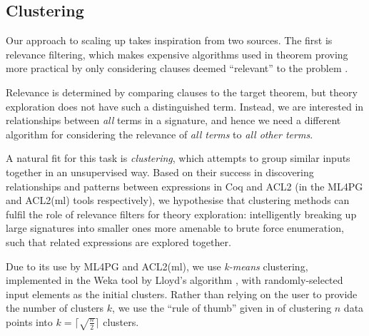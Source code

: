 \iffalse
TODO
In fact, there are similarities between the way a TE system like \qspec{} can generalise from checking \emph{particular} properties to \emph{inventing} new ones, and the way counterexample finders like \qcheck{} can generalise from testing \emph{particular} expressions to \emph{inventing} expressions to test. One of our aims is to understand the implications of this generalisation, the lessons that each can learn from the other's approach to term generation, and the consequences for testing and QA in general.
\fi

\subsection{Clustering}
\label{sec:clustering}

Our approach to scaling up \qspec{} takes inspiration from two sources. The first is relevance filtering, which makes expensive algorithms used in theorem proving more practical by only considering clauses deemed ``relevant'' to the problem \cite{meng2009lightweight}.

Relevance is determined by comparing clauses to the target theorem, but theory exploration does not have such a distinguished term. Instead, we are interested in relationships between \emph{all} terms in a signature, and hence we need a different algorithm for considering the relevance of \emph{all terms} to \emph{all other terms}.

A natural fit for this task is \emph{clustering}, which attempts to group similar inputs together in an unsupervised way. Based on their success in discovering relationships and patterns between expressions in Coq and ACL2 (in the ML4PG and ACL2(ml) tools respectively), we hypothesise that clustering methods can fulfil the role of relevance filters for theory exploration: intelligently breaking up large signatures into smaller ones more amenable to brute force enumeration, such that related expressions are explored together.

Due to its use by ML4PG and ACL2(ml), we use \emph{k-means} clustering, implemented in the Weka tool \cite{Holmes.Donkin.Witten:1994} by Lloyd's algorithm \cite{lloyd1982least}, with randomly-selected input elements as the initial clusters. Rather than relying on the user to provide the number of clusters $k$, we use the ``rule of thumb'' given in \cite[pp. 365]{mardia1979multivariate} of clustering $n$ data points into $k = \lceil \sqrt{\frac{n}{2}} \rceil$ clusters.
